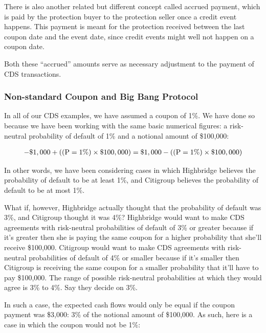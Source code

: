 \documentclass{jss}
\begin{document}
There is also another related but different concept called accrued payment, which is paid by the protection buyer to the protection seller once a credit event happens. This payment is meant for the protection received between the last coupon date and the event date, since credit events might well not happen on a coupon date.

Both these ``accrued'' amounts serve as necessary adjustment to the payment of CDS transactions.

\subsubsection{Non-standard Coupon and Big Bang Protocol}

In all of our CDS examples, we have assumed a coupon of 1\%. We have done so because we have been working with the same basic numerical figures: a risk-neutral probability of default of 1\% and a notional amount of \$100,000:

\begin{equation}
 \begin{aligned}
   {\rm - \$1,000 + ((P = 1\%) \times \$100,000) = \$1,000 - ((P = 1\%) \times \$100,000)}
    \end{aligned}
\end{equation}

In other words, we have been considering cases in which Highbridge believes the probability of default to be at least 1\%, and Citigroup believes the probability of default to be at most 1\%. 

What if, however, Highbridge actually thought that the probability of default was 3\%, and Citigroup thought it was 4\%? Highbridge would want to make CDS agreements with risk-neutral probabilities of default of 3\% or greater because if it's greater then she is paying the same coupon for a higher probability that she'll receive \$100,000. Citigroup would want to make CDS agreements with risk-neutral probabilities of default of 4\% or smaller because if it's smaller then Citigroup is receiving the same coupon for a smaller probability that it'll have to pay \$100,000. The range of possible risk-neutral probabilities at which they would agree is 3\% to 4\%. Say they decide on 3\%.

In such a case, the expected cash flows would only be equal if the coupon payment was \$3,000: 3\% of the notional amount of \$100,000. As such, here is a case in which the coupon would not be 1\%:
\end{document}
